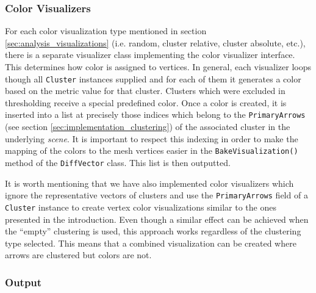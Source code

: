 \subsubsection{Color Visualizers}

For each color visualization type mentioned in section \ref{sec:analysis_visualizations} (i.e. random, cluster relative, cluster absolute, etc.), there is a separate visualizer class implementing the color visualizer interface. This determines how color is assigned to vertices. In general, each visualizer loops though all \verb+Cluster+ instances supplied and for each of them it generates a color based on the metric value for that cluster. Clusters which were excluded in thresholding receive a special predefined color. Once a color is created, it is inserted into a list at precisely those indices which belong to the \verb+PrimaryArrows+ (see section \ref{sec:implementation_clustering}) of the associated cluster in the underlying {\it scene}. It is important to respect this indexing in order to make the mapping of the colors to the mesh vertices easier in the \verb+BakeVisualization()+ method of the \verb+DiffVector+ class. This list is then outputted.

It is worth mentioning that we have also implemented color visualizers which ignore the representative vectors of clusters and use the \verb+PrimaryArrows+ field of a \verb+Cluster+ instance to create vertex color visualizations similar to the ones presented in the introduction. Even though a similar effect can be achieved when the ``empty'' clustering is used, this approach works regardless of the clustering type selected. This means that a combined visualization can be created where arrows are clustered but colors are not\footnotemark.


\subsubsection{Output}

